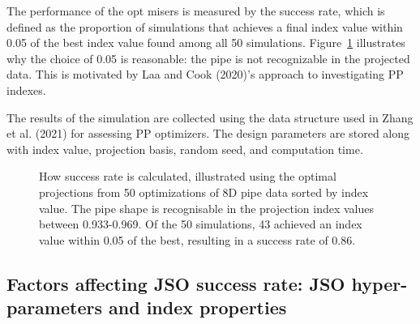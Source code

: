\documentclass[
  12pt,
]{interact}
\theoremstyle{plain}
\begin{document}
The performance of the opt misers is measured by the success rate, which
is defined as the proportion of simulations that achieves a final index
value within 0.05 of the best index value found among all 50
simulations. Figure~\ref{fig-success-rate} illustrates why the choice of
0.05 is reasonable: the pipe is not recognizable in the projected data.
This is motivated by Laa and Cook (2020)'s approach to investigating PP
indexes.

The results of the simulation are collected using the data structure
used in Zhang et al. (2021) for assessing PP optimizers. The design
parameters are stored along with index value, projection basis, random
seed, and computation time.

\begin{figure}


\caption{\label{fig-success-rate}How success rate is calculated,
illustrated using the optimal projections from 50 optimizations of 8D
pipe data sorted by index value. The pipe shape is recognisable in the
projection index values between 0.933-0.969. Of the 50 simulations, 43
achieved an index value within 0.05 of the best, resulting in a success
rate of 0.86.}

\end{figure}%

\subsection{Factors affecting JSO success rate: JSO hyper-parameters and
index properties}\label{sec-app-2}
\end{document}
